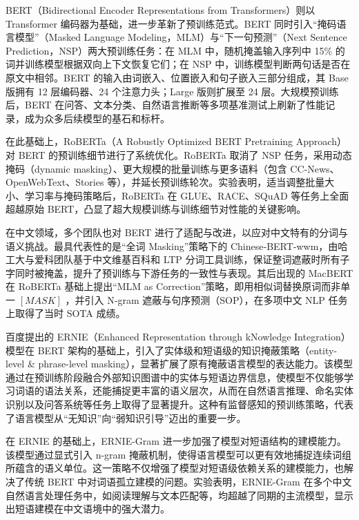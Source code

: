 \documentclass[12pt, a4paper]{ctexart}
\begin{document}
BERT（Bidirectional Encoder Representations from Transformers）则以 Transformer 编码器为基础，进一步革新了预训练范式\cite{devlin-etal-2019-bert}。BERT 同时引入“掩码语言模型”（Masked Language Modeling，MLM）与“下一句预测”（Next Sentence Prediction，NSP）两大预训练任务：在 MLM 中，随机掩盖输入序列中 15\% 的词并训练模型根据双向上下文恢复它们；在 NSP 中，训练模型判断两句话是否在原文中相邻。BERT 的输入由词嵌入、位置嵌入和句子嵌入三部分组成，其 Base 版拥有 12 层编码器、24 个注意力头；Large 版则扩展至 24 层。大规模预训练后，BERT 在问答、文本分类、自然语言推断等多项基准测试上刷新了性能记录，成为众多后续模型的基石和标杆。

在此基础上，RoBERTa（A Robustly Optimized BERT Pretraining Approach）对 BERT 的预训练细节进行了系统优化\cite{liu2019robertarobustlyoptimizedbert}。RoBERTa 取消了 NSP 任务，采用动态掩码（dynamic masking）、更大规模的批量训练与更多语料（包含 CC‑News、OpenWebText、Stories 等），并延长预训练轮次。实验表明，适当调整批量大小、学习率与掩码策略后，RoBERTa 在 GLUE、RACE、SQuAD 等任务上全面超越原始 BERT，凸显了超大规模训练与训练细节对性能的关键影响。

在中文领域，多个团队也对 BERT 进行了适配与改进，以应对中文特有的分词与语义挑战。最具代表性的是“全词 Masking”策略下的 Chinese‑BERT‑wwm，由哈工大与爱科团队基于中文维基百科和 LTP 分词工具训练，保证整词遮蔽时所有子字同时被掩盖，提升了预训练与下游任务的一致性与表现\cite{Cui_2021}。其后出现的 MacBERT 在 RoBERTa 基础上提出“MLM as Correction”策略，即用相似词替换原词而非单一 $[MASK]$ ，并引入 N‑gram 遮蔽与句序预测（SOP），在多项中文 NLP 任务上取得了当时 SOTA 成绩\cite{Cui_2020}。

百度提出的 ERNIE（Enhanced Representation through kNowledge Integration）模型在 BERT 架构的基础上，引入了实体级和短语级的知识掩蔽策略（entity-level \& phrase-level masking），显著扩展了原有掩蔽语言模型的表达能力。该模型通过在预训练阶段融合外部知识图谱中的实体与短语边界信息，使模型不仅能够学习词语的语法关系，还能捕捉更丰富的语义层次，从而在自然语言推理、命名实体识别以及问答系统等任务上取得了显著提升\cite{sun2019ernieenhancedrepresentationknowledge}。这种有监督感知的预训练策略，代表了语言模型从“无知识”向“弱知识引导”迈出的重要一步。

在 ERNIE 的基础上，ERNIE-Gram 进一步加强了模型对短语结构的建模能力。该模型通过显式引入 n-gram 掩蔽机制，使得语言模型可以更有效地捕捉连续词组所蕴含的语义单位。这一策略不仅增强了模型对短语级依赖关系的建模能力，也解决了传统 BERT 中对词语孤立建模的问题。实验表明，ERNIE-Gram 在多个中文自然语言处理任务中，如阅读理解与文本匹配等，均超越了同期的主流模型\cite{xiao2021erniegrampretrainingexplicitlyngram}，显示出短语建模在中文语境中的强大潜力。
\end{document}
